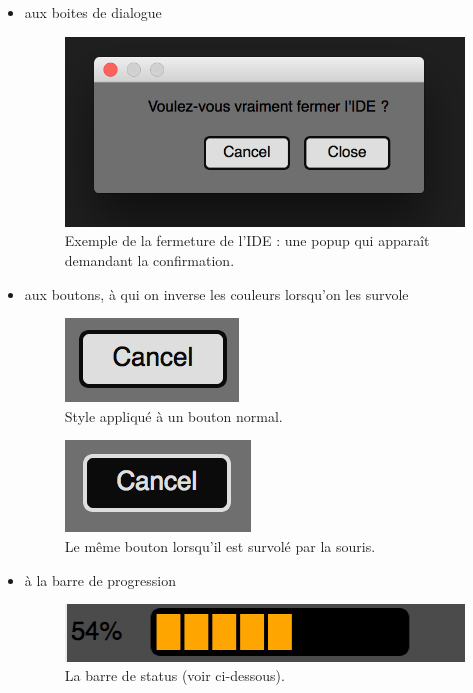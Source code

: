 \documentclass[a4paper,12pt]{article}
\begin{document}
		\begin{itemize}
			\item aux boites de dialogue
				\begin{figure}[h!]
					\begin{center}
						\includegraphics[scale=0.4]{images/imgs_themes/quit}
						\caption{ Exemple de la fermeture de l'IDE : une popup qui apparaît demandant la confirmation.}
					\end{center}
				\end{figure}
				
			\item aux boutons, à qui on inverse les couleurs lorsqu'on les survole
				\begin{figure}[h!]
					\begin{center}
						\includegraphics[scale=1]{images/imgs_themes/bout1}
						\caption{Style appliqué à un bouton normal.}
					\end{center}
				\end{figure}
				\begin{figure}[h!]
					\begin{center}
						\includegraphics[scale=1]{images/imgs_themes/bout2}
						\caption{Le même bouton lorsqu'il est survolé par la souris.}
					\end{center}
				\end{figure}
				
			\newpage
			\item à la barre de progression
			\begin{figure}[h!]
					\begin{center}
						\includegraphics[scale=0.7]{images/imgs_themes/progress2}
						\caption{La barre de status (voir ci-dessous).}
					\end{center}
				\end{figure}
		\end{itemize}
		
\end{document}
